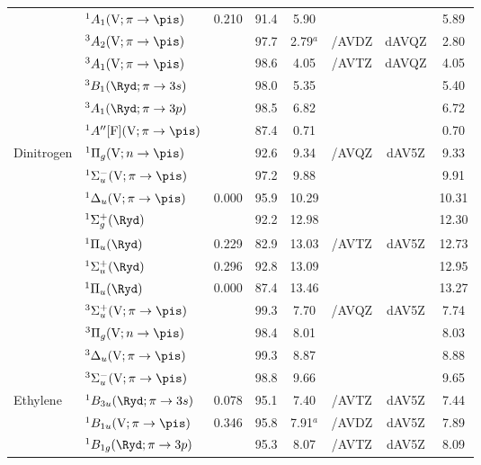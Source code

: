 \begin{tabular}{llcccccc}
        &$^1A_1 (\mathrm{V};\pi \rightarrow \pis)$				& 0.210	&91.4 &5.90		&			&			& 5.89	 \\
        &$^3A_2 (\mathrm{V};\pi \rightarrow \pis)$ 				&		&97.7 &2.79$^a$	& {\exCI}/AVDZ & dAVQZ		&2.80	\\
        &$^3A_1 (\mathrm{V};\pi \rightarrow \pis)$				&		&98.6 &4.05		& {\exCI}/AVTZ & dAVQZ		&4.05	\\
        &$^3B_1 (\Ryd;\pi \rightarrow 3s)$ 						&		&98.0 &5.35		&			&			&5.40 	\\
        &$^3A_1 (\Ryd;\pi \rightarrow 3p)$						&		&98.5 &6.82		&			&			&6.72 	\\
        &$^1A'' [\mathrm{F}]	(\mathrm{V};\pi \rightarrow \pis)$		&		&87.4 &0.71		& 			 & 			& 0.70 	\\
  Dinitrogen		&$^1\Pi_g (\mathrm{V};n \rightarrow \pis)$ 				&		&92.6 &9.34		& {\exCI}/AVQZ&dAV5Z		&9.33	 \\
        &$^1\Sigma_u^- (\mathrm{V};\pi \rightarrow \pis)$			&		&97.2 &9.88		&			&			&9.91	 \\
        &$^1\Delta_u (\mathrm{V};\pi \rightarrow \pis)$ 				& 0.000	&95.9 &10.29		&			&			&10.31	 \\
        &$^1\Sigma_g^+ (\Ryd)$ 								&		&92.2 &12.98		&			&			&12.30	 \\
        &$^1\Pi_u (\Ryd)$ 									& 0.229	&82.9 &13.03		& {\exCI}/AVTZ&dAV5Z		&12.73	 \\
        &$^1\Sigma_u^+ (\Ryd)$ 								& 0.296	&92.8 &13.09		&			&			&12.95	 \\
        &$^1\Pi_u (\Ryd)$ 									& 0.000	&87.4 &13.46		&			&			&13.27	 \\
        &$^3\Sigma_u^+ (\mathrm{V};\pi \rightarrow \pis)$			&		&99.3 &7.70		& {\exCI}/AVQZ&dAV5Z		&7.74	 \\
        &$^3\Pi_g (\mathrm{V};n \rightarrow \pis)$ 				&		&98.4 &8.01		&			&			&8.03	 \\
        &$^3\Delta_u (\mathrm{V};\pi \rightarrow \pis)$ 				&		&99.3 &8.87		&			&			&8.88	 \\
        &$^3\Sigma_u^- (\mathrm{V};\pi \rightarrow \pis)$			&		&98.8 &9.66		&			&			&9.65	 \\
  Ethylene		&$^1B_{3u} (\Ryd;\pi \rightarrow 3s)$ 					& 0.078	&95.1 &7.40		&{\exCI}/AVTZ & dAV5Z		&7.44	 \\
        &$^1B_{1u} (\mathrm{V};\pi \rightarrow \pis)$ 				& 0.346	&95.8 &7.91$^a$	&{\exCI}/AVDZ& dAV5Z		&7.89	\\
        &$^1B_{1g} (\Ryd;\pi \rightarrow 3p)$ 					&		&95.3 &8.07		& {\exCI}/AVTZ& dAV5Z		&8.09	\\

\end{tabular}
